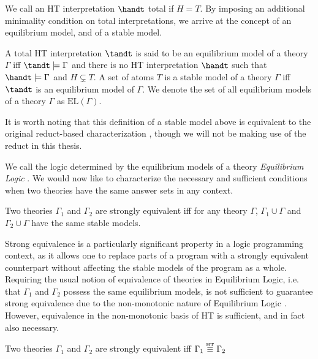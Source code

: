 We call an HT interpretation $\handt$ total if $H=T$. By imposing an
additional minimality condition on total interpretations, we arrive at
the concept of an equilibrium model, and of a stable model.

\begin{definition}
  A total HT interpretation $\tandt$ is said to be an equilibrium
  model of a theory $\Gamma$ iff $\tandt \models \Gamma$ and there is
  no HT interpretation $\handt$ such that $\handt \models \Gamma$ and
  $H \subsetneq T$. A set of atoms $T$ is a stable model of a theory
  $\Gamma$ iff $\tandt$ is an equilibrium model of $\Gamma$. We denote
  the set of all equilibrium models of a theory $\Gamma$ as
  $\text{EL}(\Gamma)$.
\end{definition}

It is worth noting that this definition of a stable model above is
equivalent to the original reduct-based characterization
\cite{lipeva01a}, though we will not be making use of the reduct in
this thesis.

We call the logic determined by the equilibrium models of a theory
\emph{Equilibrium Logic} \cite{pearce06a}. We would now like to
characterize the necessary and sufficient conditions when two theories
have the same answer sets in any context.

\begin{definition}
  Two theories $\Gamma_1$ and $\Gamma_2$ are strongly equivalent iff for
  any theory $\Gamma$, $\Gamma_1 \cup \Gamma$ and
  $\Gamma_2 \cup \Gamma$ have the same stable models.
\end{definition}

Strong equivalence is a particularly significant property in a logic
programming context, as it allows one to replace parts of a program
with a strongly equivalent counterpart without affecting the stable
models of the program as a whole. Requiring the usual notion of
equivalence of theories in Equilibrium Logic, i.e. that $\Gamma_1$ and
$\Gamma_2$ possess the same equilibrium models, is not sufficient to
guarantee strong equivalence due to the non-monotonic nature of
Equilibrium Logic \cite{lipeva01a}.  However, equivalence in the
non-monotonic basis of HT is sufficient, and in fact also necessary.

\begin{proposition}
  Two theories $\Gamma_1$ and $\Gamma_2$ are strongly equivalent
  iff $\Gamma_1 \stackrel{\normalfont\mbox{\tiny HT}}{\equiv} \Gamma_2$
\end{proposition}

